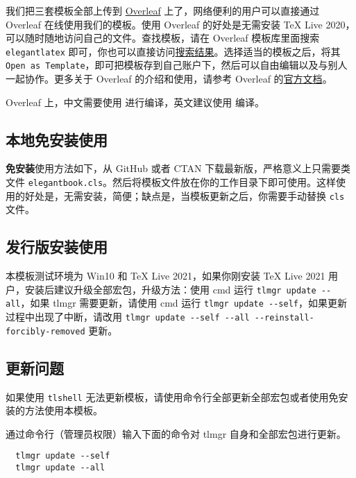 \documentclass[cn,10pt,math=newtx,citestyle=gb7714-2015,bibstyle=gb7714-2015]{elegantbook}
\begin{document}
我们把三套模板全部上传到 \href{https://www.overleaf.com/}{Overleaf} 上了，网络便利的用户可以直接通过 Overleaf 在线使用我们的模板。使用 Overleaf 的好处是无需安装 \TeX{} Live 2020，可以随时随地访问自己的文件。查找模板，请在 Overleaf 模板库里面搜索 \lstinline{elegantlatex} 即可，你也可以直接访问\href{https://www.overleaf.com/latex/templates?addsearch=elegantlatex}{搜索结果}。选择适当的模板之后，将其 \lstinline{Open as Template}，即可把模板存到自己账户下，然后可以自由编辑以及与别人一起协作。更多关于 Overleaf 的介绍和使用，请参考 Overleaf 的\href{https://www.overleaf.com/learn}{官方文档}。

\begin{remark}
Overleaf 上，中文需要使用  进行编译，英文建议使用  编译。
\end{remark}

\subsection{本地免安装使用}

\textbf{免安装}使用方法如下，从 GitHub 或者 CTAN 下载最新版，严格意义上只需要类文件 \lstinline{elegantbook.cls}。然后将模板文件放在你的工作目录下即可使用。这样使用的好处是，无需安装，简便；缺点是，当模板更新之后，你需要手动替换 \lstinline{cls} 文件。

\subsection{发行版安装使用}

本模板测试环境为 Win10 和 TeX Live 2021，如果你刚安装 \TeX{} Live 2021 用户，安装后建议升级全部宏包，升级方法：使用 cmd 运行 \lstinline{tlmgr update --all}，如果 tlmgr 需要更新，请使用 cmd 运行 \lstinline{tlmgr update --self}，如果更新过程中出现了中断，请改用 \lstinline{tlmgr update --self --all --reinstall-forcibly-removed} 更新。

\subsection{更新问题}

如果使用 \lstinline{tlshell} 无法更新模板，请使用命令行全部更新全部宏包或者使用免安装的方法使用本模板。

通过命令行（管理员权限）输入下面的命令对 tlmgr 自身和全部宏包进行更新。

\begin{lstlisting}
  tlmgr update --self 
  tlmgr update --all
\end{lstlisting}
\end{document}
